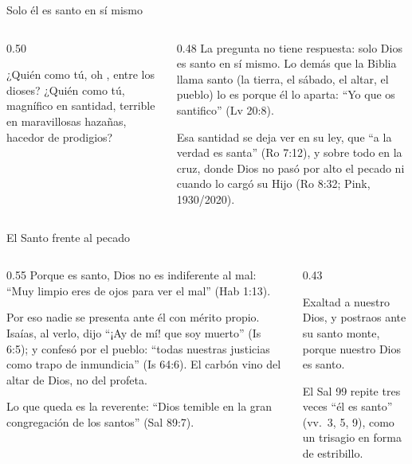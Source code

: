 \begin{frame}{Solo él es santo en sí mismo}
\begin{columns}[t,onlytextwidth]
\begin{column}{0.50\textwidth}
\begin{cita}¿Quién como tú, oh \SENOR{}, entre los dioses? ¿Quién como tú, magnífico en santidad, terrible en maravillosas hazañas, hacedor de prodigios?\end{cita}
\end{column}
\begin{column}{0.48\textwidth}\small
La pregunta no tiene respuesta: solo Dios es santo en sí mismo. Lo demás que la Biblia llama santo (la tierra, el sábado, el altar, el pueblo) lo es porque él lo aparta: ``Yo \SENOR{} que os santifico'' (Lv 20:8).\par\medskip
Esa santidad se deja ver en su ley, que ``a la verdad es santa'' (Ro 7:12), y sobre todo en la cruz, donde Dios no pasó por alto el pecado ni cuando lo cargó su Hijo (Ro 8:32; Pink, 1930/2020).
\end{column}
\end{columns}
\end{frame}

\begin{frame}{El Santo frente al pecado}
\begin{columns}[t,onlytextwidth]
\begin{column}{0.55\textwidth}\small
Porque es santo, Dios no es indiferente al mal: ``Muy limpio eres de ojos para ver el mal'' (Hab 1:13).\par\medskip
Por eso nadie se presenta ante él con mérito propio. Isaías, al verlo, dijo ``¡Ay de mí! que soy muerto'' (Is 6:5); y confesó por el pueblo: ``todas nuestras justicias como trapo de inmundicia'' (Is 64:6). El carbón vino del altar de Dios, no del profeta.\par\medskip
Lo que queda es la  reverente: ``Dios temible en la gran congregación de los santos'' (Sal 89:7).
\end{column}
\begin{column}{0.43\textwidth}
\begin{cita}Exaltad a \SENOR{} nuestro Dios, y postraos ante su santo monte, porque \SENOR{} nuestro Dios es santo.\end{cita}
\footnotesize El Sal 99 repite tres veces ``él es santo'' (vv.~3, 5, 9), como un trisagio en forma de estribillo.\par\smallskip
{}
\end{column}
\end{columns}
\end{frame}

